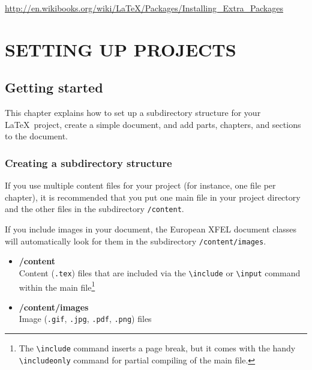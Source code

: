 \documentclass[]{xfel.eu-report}
\begin{document}
\url{http://en.wikibooks.org/wiki/LaTeX/Packages/Installing_Extra_Packages}

\stopcontents

\part{SETTING UP PROJECTS}	

\chapter{Getting started }

\startcontents

This chapter explains how to set up a subdirectory structure for your \LaTeX\ project, create a simple document, 
and add parts, chapters, and sections to the document.
\linebreak


\section{Creating a subdirectory structure}
If you use multiple content files for your project (for instance, one file per chapter), it is recommended that you put one main file in 
your project directory and the other files in the subdirectory {\tt /content}.

 If you include images in your document, the European XFEL document classes will automatically look for them in the subdirectory 
{\tt /content/images}.

\begin{itemize}
\item {\bf /content} \\
Content ({\tt *.tex}) files that are included via the {\tt \textbackslash include} or {\tt \textbackslash input} command within the main file\footnote{The {\tt \textbackslash include} command inserts a page break, but it comes with the handy  {\tt \textbackslash includeonly} command for partial compiling of the main file.} 
\linebreak
\item {\bf /content/images} \\
Image ({\tt *.gif}, {\tt *.jpg}, {\tt *.pdf}, {\tt *.png}) files
\end{itemize}
\end{document}
